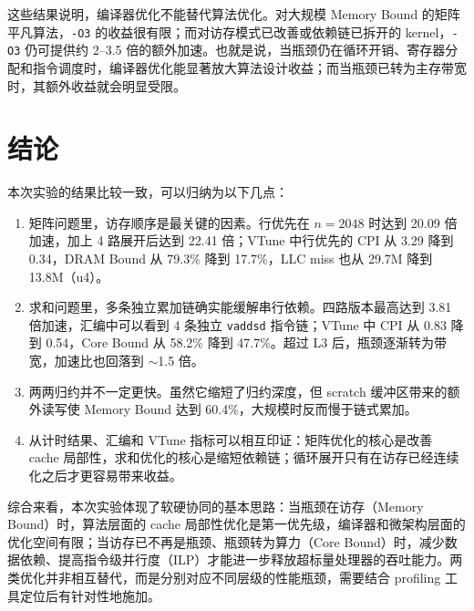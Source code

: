 \documentclass[a4paper,11pt,UTF8]{ctexart}
\begin{document}
这些结果说明，编译器优化不能替代算法优化。对大规模 Memory Bound 的矩阵平凡算法，\texttt{-O3} 的收益很有限；而对访存模式已改善或依赖链已拆开的 kernel，\texttt{-O3} 仍可提供约 2--3.5 倍的额外加速。也就是说，当瓶颈仍在循环开销、寄存器分配和指令调度时，编译器优化能显著放大算法设计收益；而当瓶颈已转为主存带宽时，其额外收益就会明显受限。

\section{结论}
本次实验的结果比较一致，可以归纳为以下几点：

\begin{enumerate}
  \item 矩阵问题里，访存顺序是最关键的因素。行优先在 $n=2048$ 时达到 20.09 倍加速，加上 4 路展开后达到 22.41 倍；VTune 中行优先的 CPI 从 3.29 降到 0.34，DRAM Bound 从 79.3\% 降到 17.7\%，LLC miss 也从 29.7M 降到 13.8M（u4）。
  \item 求和问题里，多条独立累加链确实能缓解串行依赖。四路版本最高达到 3.81 倍加速，汇编中可以看到 4 条独立 \texttt{vaddsd} 指令链；VTune 中 CPI 从 0.83 降到 0.54，Core Bound 从 58.2\% 降到 47.7\%。超过 L3 后，瓶颈逐渐转为带宽，加速比也回落到 $\sim$1.5 倍。
  \item 两两归约并不一定更快。虽然它缩短了归约深度，但 scratch 缓冲区带来的额外读写使 Memory Bound 达到 60.4\%，大规模时反而慢于链式累加。
  \item 从计时结果、汇编和 VTune 指标可以相互印证：矩阵优化的核心是改善 cache 局部性，求和优化的核心是缩短依赖链；循环展开只有在访存已经连续化之后才更容易带来收益。
\end{enumerate}

综合来看，本次实验体现了软硬协同的基本思路：当瓶颈在访存（Memory Bound）时，算法层面的 cache 局部性优化是第一优先级，编译器和微架构层面的优化空间有限；当访存已不再是瓶颈、瓶颈转为算力（Core Bound）时，减少数据依赖、提高指令级并行度（ILP）才能进一步释放超标量处理器的吞吐能力。两类优化并非相互替代，而是分别对应不同层级的性能瓶颈，需要结合 profiling 工具定位后有针对性地施加。
\end{document}
